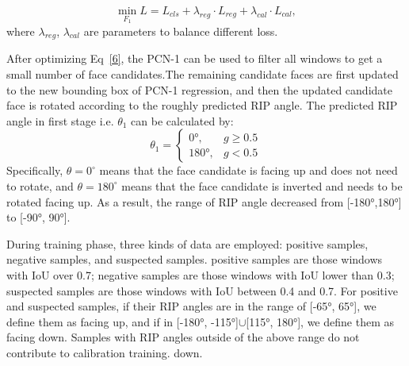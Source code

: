 \documentclass{article}
\begin{document}
\begin{multicols}{2}
\begin{equation}
\min_{F_{1}}L = L_{cls} + \lambda_{reg} \cdot L_{reg} + \lambda_{cal} \cdot L_{cal},\tag{6}\label{6}
\end{equation}
where $\lambda_{reg}$, $\lambda_{cal}$ are parameters to balance different loss.
\par After optimizing Eq~\eqref{6}, the PCN-1 can be used to filter all windows to get a small number of face candidates.The remaining candidate faces are first updated to the new bounding box of PCN-1 regression, and then the updated candidate face is rotated according to the roughly predicted RIP angle. The predicted RIP angle in first stage i.e. $\theta_{1}$ can be calculated by:
\begin{equation}
    \theta_{1} = \begin{cases} \ang{0}, &g\ge0.5\\
                                \ang{180},&g<0.5 \end{cases} \tag{7}
\end{equation}
Specifically, $\theta = 0^\circ$ means that the face candidate is facing up and does not need to rotate, and $\theta = 180^\circ$ means that the face candidate is inverted and needs to be rotated facing up. As a result, the range of RIP angle decreased from [\ang{-180},\ang{180}] to [\ang{-90}, \ang{90}].
\par During training phase, three kinds of data are employed: positive samples, negative samples, and suspected samples. positive samples are those windows with IoU over 0.7; negative samples are those windows with IoU lower than 0.3; suspected samples are those windows with IoU between 0.4 and 0.7. For positive
and suspected samples, if their RIP angles are in the range of [\ang{-65}, \ang{65}], we define them as facing up, and if in [\ang{-180}, \ang{-115}]$\cup$[\ang{115}, \ang{180}], we define them as facing down. Samples with RIP angles outside of the above range do not contribute to calibration training.
down.
\end{multicols}
\newpage

\end{document}
